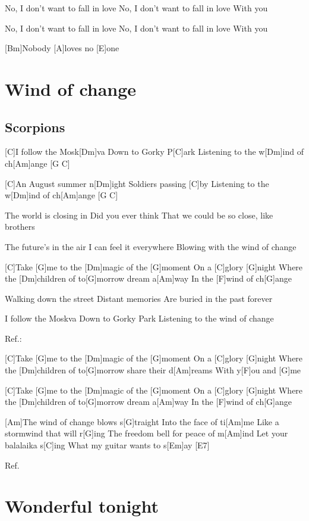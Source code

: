 \documentclass[a4paper,12pt]{article}
\begin{document}
\begin{multicols}{2}
\begin{guitar}
No, I   don't want to fall in love
No, I   don't want to fall in love
With you

No, I   don't want to fall in love
No, I   don't want to fall in love
With you


[Bm]Nobody [A]loves no [E]one


\end{guitar}
\section{Wind of change}
\subsection*{Scorpions}
\begin{guitar}

[C]I follow the Mosk[Dm]va
Down to Gorky P[C]ark
Listening to the w[Dm]ind of ch[Am]ange [G C]

[C]An August summer n[Dm]ight
Soldiers passing [C]by
Listening to the w[Dm]ind of ch[Am]ange [G C]


The world is closing in
Did you ever think
That we could be so close, like brothers


The future's in the air
I can feel it everywhere
Blowing with the wind of change


[C]Take [G]me to the [Dm]magic of the [G]moment
On a [C]glory [G]night
Where the [Dm]children of to[G]morrow dream a[Am]way
In the [F]wind of ch[G]ange


Walking down the street
Distant memories
Are buried in the past forever


I follow the Moskva
Down to Gorky Park
Listening to the wind of change


Ref.:

[C]Take [G]me to the [Dm]magic of the [G]moment
On a [C]glory [G]night
Where the [Dm]children of to[G]morrow 
share their d[Am]reams
With y[F]ou and [G]me


[C]Take [G]me to the [Dm]magic of the [G]moment
On a [C]glory [G]night
Where the [Dm]children of to[G]morrow dream a[Am]way
In the [F]wind of ch[G]ange


[Am]The wind of change blows s[G]traight
Into the face of ti[Am]me
Like a stormwind that will r[G]ing
The freedom bell for peace of m[Am]ind
Let your balalaika s[C]ing
What my guitar wants to s[Em]ay [E7]


Ref.

\end{guitar}
\section{Wonderful tonight}

\end{multicols}
\end{document}
